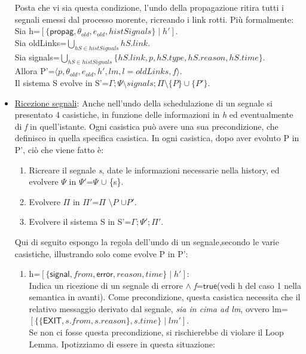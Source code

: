 \documentclass[Contributo.tex]{subfiles}
\begin{document}
\begin{itemize}
		Posta che vi sia questa condizione, l'undo della propagazione ritira tutti i segnali emessi dal processo morente, ricreando i link rotti.
		Più formalmente:\\
		Sia h=$\displaystyle [\{\mathsf{propag},\theta_{old},e_{old},histSignals\} \mid h']$.\\
		Sia oldLinks=$\displaystyle  \bigcup_{hS \in histSignals}hS.link $.\\ 
		Sia signals=$\displaystyle \bigcup_{hS \in histSignals}\{hS.link,p,hS.type,hS.reason,hS.time\}$.\\
		Allora P'=$\displaystyle \langle p,\theta_{old},e_{old},h',lm,l=oldLinks,f \rangle$.\\
		Il sistema S evolve in S'=$\displaystyle \Gamma;\Psi \setminus signals;\Pi \setminus \{P\} \cup \{P'\} $.
		\item \underline{Ricezione segnali}: Anche nell'undo della schedulazione di un segnale si presentato 4 casistiche, in funzione delle informazioni in \textit{h} ed eventualmente di \textit{f} in quell'istante.
		Ogni casistica può avere una sua precondizione, che definisco in quella specifica casistica.
		In ogni casistica, dopo aver evoluto P in P', ciò che viene fatto è:
		\begin{enumerate}
			\item Ricreare il segnale \textit{s}, date le informazioni necessarie nella history, ed evolvere $\Psi$ in $\Psi'$=$\Psi$ $\cup$ \{s\}.
			\item Evolvere $\Pi$ in $\Pi'$=$\Pi$ $\setminus{P}$ $\cup{P'}$.
			\item Evolvere il sistema S in S'=$\displaystyle \Gamma;\Psi';\Pi'$.
		\end{enumerate}
		Qui di seguito espongo la regola dell'undo di un segnale,secondo le varie casistiche, illustrando solo come evolve P in P':
		\begin{enumerate}
		\item h=$\displaystyle [\{\mathsf{signal},from,\mathsf{error},reason,time\} \mid h']$:\\
			  Indica un ricezione di un  segnale di errore $\wedge$ \textit{f}=$\mathsf{true}$(vedi h del caso 1 nella semantica in avanti).
			  Come precondizione, questa casistica necessita che il relativo messaggio derivato dal segnale, \textit{sia in cima ad lm}, ovvero lm=$\displaystyle [\{\{\mathsf{EXIT},s.from,s.reason\},s.time\} \mid lm']$.\\
			  Se non ci fosse questa precondizione, si rischierebbe di violare il Loop Lemma. Ipotizziamo di essere in questa situazione:\\

\end{enumerate}
\end{itemize}
\end{document}
